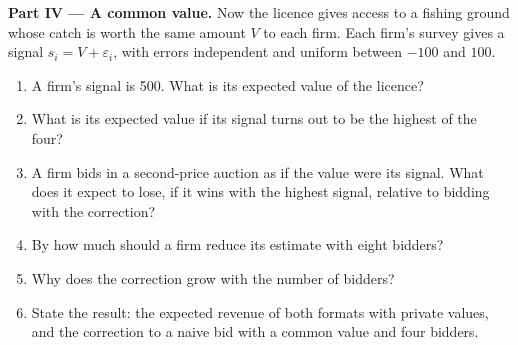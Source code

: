 \begin{problem}
\medskip
\noindent\textbf{Part IV --- A common value.} Now the licence gives access to a fishing ground whose catch is worth the
same amount $V$ to each firm. Each firm's survey gives a signal $s_i = V + \varepsilon_i$, with errors independent and uniform between
$-100$ and $100$.
\begin{enumerate}[resume]
  \item A firm's signal is 500. What is its expected value of the licence?
  \item What is its expected value if its signal turns out to be the highest of the four?
  \item A firm bids in a second-price auction as if the value were its signal. What does it expect to lose, if it wins
    with the highest signal, relative to bidding with the correction?
  \item By how much should a firm reduce its estimate with eight bidders?
  \item Why does the correction grow with the number of bidders?
  \item State the result: the expected revenue of both formats with private values, and the correction to a naive bid with
    a common value and four bidders.
\end{enumerate}
\end{problem}
